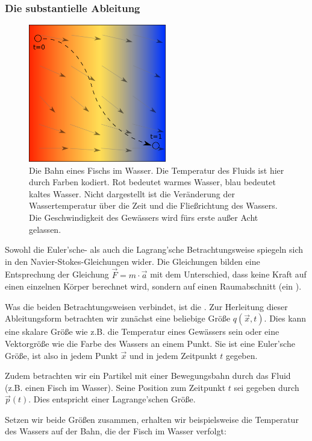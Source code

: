 \subsubsection{Die substantielle Ableitung}

\begin{figure}[ht]
\includegraphics[width=6cm]{images/swimmer_in_water}
\caption{Die Bahn eines Fischs im Wasser. Die Temperatur des Fluids ist hier durch Farben kodiert. Rot bedeutet warmes Wasser, blau bedeutet kaltes Wasser. Nicht dargestellt ist die Veränderung der Wassertemperatur über die Zeit und die Fließrichtung des Wassers. Die Geschwindigkeit des Gewässers wird fürs erste außer Acht gelassen.}
\end{figure}

Sowohl die Euler'sche- als auch die Lagrang'sche Betrachtungsweise spiegeln sich
in den Navier-Stokes-Gleichungen wider. Die Gleichungen bilden eine Entsprechung
der Gleichung $\vec{F} = m \cdot \vec{a}$ mit dem Unterschied, dass keine Kraft
auf einen einzelnen Körper berechnet wird, sondern auf einen Raumabschnitt (ein
).

Was die beiden Betrachtungsweisen verbindet, ist die
. Zur Herleitung dieser Ableitungsform
betrachten wir zunächst eine beliebige Größe $q(\vec{x},t)$. Dies kann eine
skalare Größe wie z.B. die Temperatur eines Gewässers sein oder eine Vektorgröße
wie die Farbe des Wassers an einem Punkt. Sie ist eine Euler'sche Größe, ist
also in jedem Punkt $\vec{x}$ und in jedem Zeitpunkt $t$ gegeben.

Zudem betrachten wir ein Partikel mit einer Bewegungsbahn durch das Fluid (z.B.
einen Fisch im Wasser). Seine Position zum Zeitpunkt $t$ sei gegeben durch
$\vec{p}(t)$. Dies entspricht einer Lagrange'schen Größe.

Setzen wir beide Größen zusammen, erhalten wir beispielsweise die Temperatur des
Wassers auf der Bahn, die der Fisch im Wasser verfolgt:

